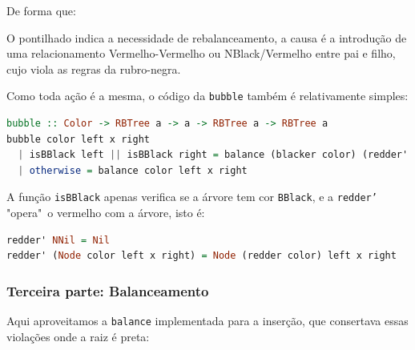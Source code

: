 De forma que:

\begin{figure}[!ht]
	\centering
\end{figure}
\FloatBarrier

O pontilhado indica a necessidade de rebalanceamento, a causa é a introdução de uma relacionamento Vermelho-Vermelho ou NBlack/Vermelho entre pai e filho, cujo viola as regras da rubro-negra.

Como toda ação é a mesma, o código da \texttt{bubble} também é relativamente simples:

\begin{lstlisting}[language=Haskell]
bubble :: Color -> RBTree a -> a -> RBTree a -> RBTree a
bubble color left x right
  | isBBlack left || isBBlack right = balance (blacker color) (redder' left) x (redder' right)
  | otherwise = balance color left x right
\end{lstlisting}
\FloatBarrier

A função \texttt{isBBlack} apenas verifica se a árvore tem cor \texttt{BBlack}, e a \texttt{redder'} "opera"\ o vermelho com a árvore, isto é:

\begin{lstlisting}[language=Haskell]
redder' NNil = Nil
redder' (Node color left x right) = Node (redder color) left x right
\end{lstlisting}
\FloatBarrier

\subsubsection{Terceira parte: Balanceamento}

Aqui aproveitamos a \texttt{balance} implementada para a inserção, que consertava essas violações onde a raiz é preta:

\begin{figure}[!ht]
	\centering
\end{figure}
\FloatBarrier

